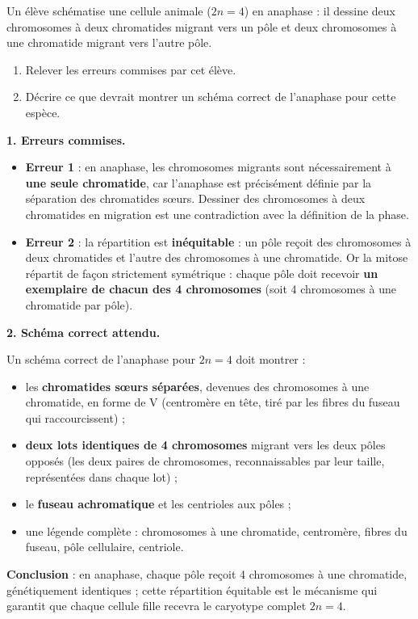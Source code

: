 \documentclass[11pt]{article}
\begin{document}
\begin{exoresolu}
Un élève schématise une cellule animale ($2n = 4$) en anaphase : il dessine deux chromosomes à deux chromatides migrant vers un pôle et deux chromosomes à une chromatide migrant vers l'autre pôle.
\begin{enumerate}
\item Relever les erreurs commises par cet élève.
\item Décrire ce que devrait montrer un schéma correct de l'anaphase pour cette espèce.
\end{enumerate}
\tcblower
\textbf{1. Erreurs commises.}

\begin{itemize}
\item \textbf{Erreur 1} : en anaphase, les chromosomes migrants sont nécessairement à \textbf{une seule chromatide}, car l'anaphase est précisément définie par la séparation des chromatides sœurs. Dessiner des chromosomes à deux chromatides en migration est une contradiction avec la définition de la phase.
\item \textbf{Erreur 2} : la répartition est \textbf{inéquitable} : un pôle reçoit des chromosomes à deux chromatides et l'autre des chromosomes à une chromatide. Or la mitose répartit de façon strictement symétrique : chaque pôle doit recevoir \textbf{un exemplaire de chacun des 4 chromosomes} (soit 4 chromosomes à une chromatide par pôle).
\end{itemize}

\textbf{2. Schéma correct attendu.}

Un schéma correct de l'anaphase pour $2n = 4$ doit montrer :
\begin{itemize}
\item les \textbf{chromatides sœurs séparées}, devenues des chromosomes à une chromatide, en forme de V (centromère en tête, tiré par les fibres du fuseau qui raccourcissent) ;
\item \textbf{deux lots identiques de 4 chromosomes} migrant vers les deux pôles opposés (les deux paires de chromosomes, reconnaissables par leur taille, représentées dans chaque lot) ;
\item le \textbf{fuseau achromatique} et les centrioles aux pôles ;
\item une légende complète : chromosomes à une chromatide, centromère, fibres du fuseau, pôle cellulaire, centriole.
\end{itemize}

\textbf{Conclusion} : en anaphase, chaque pôle reçoit 4 chromosomes à une chromatide, génétiquement identiques ; cette répartition équitable est le mécanisme qui garantit que chaque cellule fille recevra le caryotype complet $2n = 4$.
\end{exoresolu}
\end{document}
